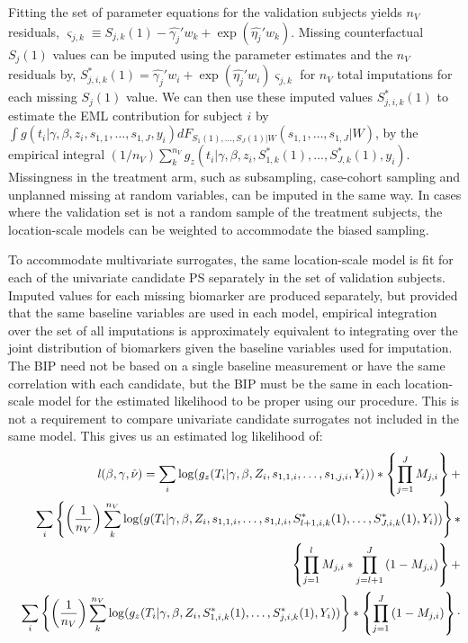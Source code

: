 \documentclass[times, doublespace]{simauth}
\begin{document}
Fitting the set of parameter equations for the validation subjects yields $n_V$ residuals, $\varsigma_{j,k} \equiv S_{j,k}(1) - \hat{\gamma_j}'w_{k} + \exp(\hat{\eta_j}'w_{k})$. Missing counterfactual $S_{j}(1)$ values can be imputed using the parameter estimates and the $n_V$ residuals by, $S_{j,i,k}^*(1) = \hat{\gamma_j}'w_{i} + \exp(\hat{\eta_j}'w_{i}) \varsigma_{j,k}$ for $n_V$ total imputations for each missing $S_{j}(1)$ value. We can then use these imputed values $S_{j,i,k}^*(1)$ to estimate the EML contribution for subject $i$ by $\int g(t_i|\gamma, \beta, z_i, s_{1,1}, \ldots, s_{1,J}, y_i)dF_{S_{1}(1),\ldots,S_{J}(1)|W}(s_{1,1},\ldots,s_{1,J}|W)$, by the empirical integral ${\left(1/n_{V}\right)}\sum_k^{n_V}{g_z(t_i|\gamma, \beta,z_i, S_{1,k}^*(1), \ldots,S_{J,k}^*(1),y_i)}$. Missingness in the treatment arm, such as subsampling, case-cohort sampling and unplanned missing at random variables, can be imputed in the same way. In cases where the validation set is not a random sample of the treatment subjects, the location-scale models can be weighted to accommodate the biased sampling.

To accommodate multivariate surrogates, the same location-scale model is fit for each of the univariate candidate PS separately in the set of validation subjects. Imputed values for each missing biomarker are produced separately, but provided that the same baseline variables are used in each model, empirical integration over the set of all imputations is approximately equivalent to integrating over the joint distribution of biomarkers given the baseline variables used for imputation. The BIP need not be based on a single baseline measurement or have the same correlation with each candidate, but the BIP must be the same in each location-scale model for the estimated likelihood to be proper using our procedure. This is not a requirement to compare univariate candidate surrogates not included in the same model. This gives us an estimated log likelihood of:
\begin{eqnarray*}
&&\mathit{l}(\beta,\gamma, \hat{\nu})=\sum_{i} \log(g_z(T_i|\gamma, \beta,Z_i, s_{1,1,i}, \ldots,s_{1,j,i},Y_i))*\left\{\prod_{j=1}^{J}{M
_{j,i}}\right\}+\\
&&\sum_{i}\left\{\left({1 \over n_{V}}\right)\sum_k^{n_V}{\log(g(T_i|\gamma, \beta, Z_i,s_{1,1,i},\ldots, s_{1,l,i}, S^{*}_{l+1,i,k}(1),\ldots, S^{*}_{J,i,k}(1), Y_i))}\right\}*\\
&&\left\{\prod_{j=1}^{l}{M_{j,i}}*\prod_{j=l+1}^{J}{(1-M_{j,i})}\right\}+\\
&&\sum_{i}\left\{\left({1 \over n_{V}}\right)\sum_k^{n_V}{\log(g_z(T_i|\gamma, \beta,Z_i, S_{1,i,k}^*(1), \ldots,S_{j,i,k}^*(1),Y_i))}\right\}*\left\{\prod_{j=1}^{J}{(1-M
_{j,i})}\right\}\cdot
\end{eqnarray*}
\end{document}
